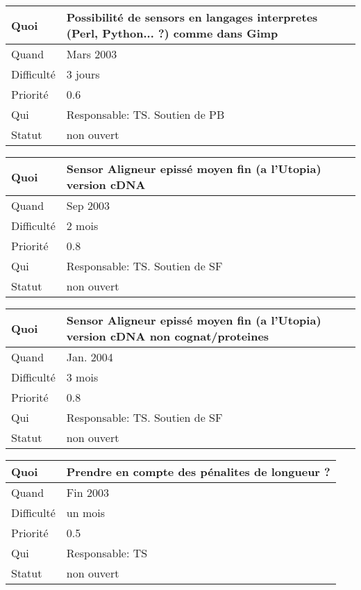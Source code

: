 \documentclass[a4paper,11pt]{article}
\begin{document}
\begin{longtable}{|l|p{7cm}|}\hline
  Quoi & Possibilit\'e de sensors en langages interpretes (Perl, Python... ?)
comme dans Gimp \\\hline
  Quand  &   Mars 2003 \\\hline
  Difficult\'e &  3 jours\\\hline
  Priorit\'e & 0.6 \\\hline
  Qui & Responsable: TS. Soutien de PB\\\hline
  Statut & non ouvert\\\hline
\end{longtable}

\begin{longtable}{|l|p{7cm}|}\hline
  Quoi & Sensor Aligneur episs{\'e} moyen fin (a l'Utopia) version cDNA\\\hline
  Quand  &  Sep 2003\\\hline
  Difficult\'e &  2 mois\\\hline
  Priorit\'e &  0.8\\\hline
  Qui & Responsable: TS. Soutien de SF\\\hline
  Statut & non ouvert\\\hline
\end{longtable}

\begin{longtable}{|l|p{7cm}|}\hline
  Quoi & Sensor Aligneur episs{\'e} moyen fin (a l'Utopia) version cDNA non
cognat/proteines \\\hline
  Quand  &  Jan. 2004\\\hline
  Difficult\'e &  3 mois\\\hline
  Priorit\'e &  0.8\\\hline
  Qui & Responsable: TS. Soutien de SF\\\hline
  Statut & non ouvert\\\hline
\end{longtable}

\begin{longtable}{|l|p{7cm}|}\hline
  Quoi & Prendre en compte des p\'enalites de longueur ?\\\hline
  Quand  &  Fin 2003\\\hline
  Difficult\'e &  un mois \\\hline
  Priorit\'e & 0.5 \\\hline
  Qui & Responsable: TS\\\hline
  Statut & non ouvert\\\hline
\end{longtable}
\end{document}
